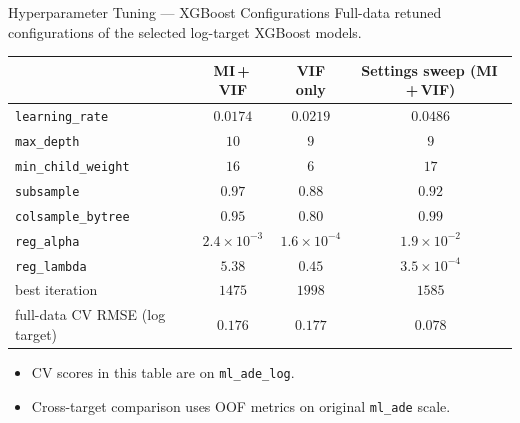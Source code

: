 \begin{frame}[noframenumbering]{Hyperparameter Tuning — XGBoost Configurations}
  \footnotesize
  Full-data retuned configurations of the selected log-target XGBoost models.
  \vspace{0.3em}

  \scriptsize
  \renewcommand{\arraystretch}{1.05}
  \begin{center}
  \begin{tabular}{@{}lccc@{}}
    \toprule
     & \textbf{MI\,+\,VIF} & \textbf{VIF only} & \textbf{Settings sweep (MI\,+\,VIF)} \\
    \midrule
    \texttt{learning\_rate}    & $0.0174$ & $0.0219$ & $0.0486$ \\
    \texttt{max\_depth}        & $10$     & $9$      & $9$ \\
    \texttt{min\_child\_weight}& $16$     & $6$      & $17$ \\
    \texttt{subsample}         & $0.97$   & $0.88$   & $0.92$ \\
    \texttt{colsample\_bytree} & $0.95$   & $0.80$   & $0.99$ \\
    \texttt{reg\_alpha}        & $2.4\!\times\!10^{-3}$ & $1.6\!\times\!10^{-4}$ & $1.9\!\times\!10^{-2}$ \\
    \texttt{reg\_lambda}       & $5.38$                 & $0.45$                 & $3.5\!\times\!10^{-4}$ \\
    best iteration             & $1475$   & $1998$   & $1585$ \\
    full-data CV RMSE (log target) & $0.176$  & $0.177$  & $\mathbf{0.078}$ \\
    \bottomrule
  \end{tabular}
  \end{center}

  \vspace{0.3em}
  \scriptsize
  \begin{itemize}\setlength\itemsep{0.08em}
    \item CV scores in this table are on \texttt{ml\_ade\_log}.
    \item Cross-target comparison uses OOF metrics on original
      \texttt{ml\_ade} scale.
  \end{itemize}
\end{frame}


